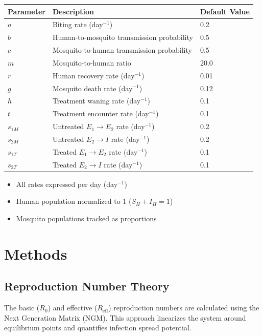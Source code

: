 \documentclass{article}
\begin{document}
\begin{tabular}{lll}
    \toprule
    Parameter & Description & Default Value \\
    \midrule
    $a$ & Biting rate (day$^{-1}$) & 0.2 \\
    $b$ & Human-to-mosquito transmission probability & 0.5 \\
    $c$ & Mosquito-to-human transmission probability & 0.5 \\
    $m$ & Mosquito-to-human ratio & 20.0 \\
    $r$ & Human recovery rate (day$^{-1}$) & 0.01 \\
    $g$ & Mosquito death rate (day$^{-1}$) & 0.12 \\
    $h$ & Treatment waning rate (day$^{-1}$) & 0.1 \\
    $t$ & Treatment encounter rate (day$^{-1}$) & 0.1 \\
    $s_{1M}$ & Untreated $E_1 \rightarrow E_2$ rate (day$^{-1}$) & 0.2 \\
    $s_{2M}$ & Untreated $E_2 \rightarrow I$ rate (day$^{-1}$) & 0.2 \\
    $s_{1T}$ & Treated $E_1 \rightarrow E_2$ rate (day$^{-1}$) & 0.1 \\
    $s_{2T}$ & Treated $E_2 \rightarrow I$ rate (day$^{-1}$) & 0.1 \\
    \bottomrule
\end{tabular}

\begin{itemize}
    \item All rates expressed per day (day$^{-1}$)
    \item Human population normalized to 1 ($S_H + I_H = 1$)
    \item Mosquito populations tracked as proportions
\end{itemize}

\section{Methods}
\subsection{Reproduction Number Theory}
The basic ($R_0$) and effective ($R_{\text{eff}}$) reproduction numbers are calculated using the Next Generation Matrix (NGM). This approach linearizes the system around equilibrium points and quantifies infection spread potential.
\end{document}
